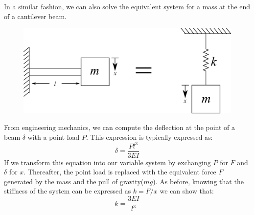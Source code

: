 \documentclass[12pt,letter]{article}
\begin{document}
			In a similar fashion, we can also solve the equivalent system for a mass at the end of a cantilever beam.
			\begin{figure}[H]
				\centering
				\includegraphics[]{../figures/spring_and_bar_mass_cantilever_beam.png}
			\end{figure}			
			From engineering mechanics, we can compute the deflection at the point of a beam $\delta$ with a point load $P$. This expression is typically expressed as:
			\begin{equation}
				\delta = \frac{Pl^3}{3EI}
			\end{equation}					
			If we transform this equation into our variable system by exchanging $P$ for $F$ and $\delta$ for $x$. Thereafter, the point load is replaced with the equivalent force $F$ generated by the mass and the pull of gravity($mg$). As before, knowing that the stiffness of the system can be expressed as $k=F/x$ we can show that:
			\begin{equation}
				k = \frac{3EI}{l^3}
			\end{equation}	
\end{document}
